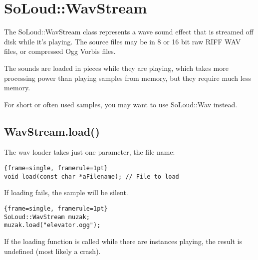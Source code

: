 
\chapter{SoLoud::WavStream}

The SoLoud::WavStream class represents a wave sound effect that is streamed off disk while it's playing. The source files may be in 8 or 16 bit raw RIFF WAV files, or compressed Ogg Vorbis files.

The sounds are loaded in pieces while they are playing, which takes more processing power than playing samples from memory, but they require much less memory.

For short or often used samples, you may want to use SoLoud::Wav instead.

\section{WavStream.load()}

The wav loader takes just one parameter, the file name:

\begin{lstlisting}{frame=single, framerule=1pt}
void load(const char *aFilename); // File to load
\end{lstlisting}

If loading fails, the sample will be silent.

\begin{lstlisting}{frame=single, framerule=1pt}
SoLoud::WavStream muzak;
muzak.load("elevator.ogg");
\end{lstlisting}

If the loading function is called while there are instances playing, the result is undefined (most likely a crash).

